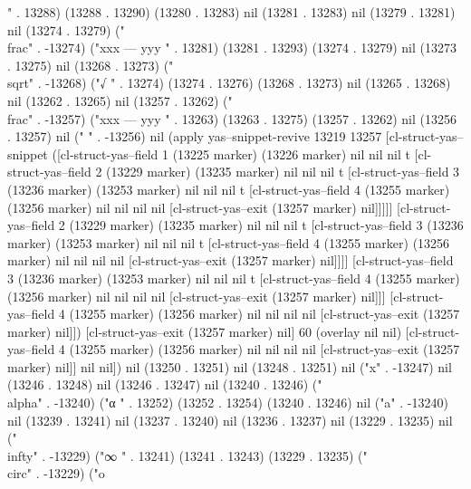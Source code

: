{" . 13288) (13288 . 13290) (13280 . 13283) nil (13281 . 13283) nil (13279 . 13281) nil (13274 . 13279) ("\\frac" . -13274) ("xxx
---
yyy
" . 13281) (13281 . 13293) (13274 . 13279) nil (13273 . 13275) nil (13268 . 13273) ("\\sqrt" . -13268) ("√
" . 13274) (13274 . 13276) (13268 . 13273) nil (13265 . 13268) nil (13262 . 13265) nil (13257 . 13262) ("\\frac" . -13257) ("xxx
---
yyy
" . 13263) (13263 . 13275) (13257 . 13262) nil (13256 . 13257) nil (" " . -13256) nil (apply yas--snippet-revive 13219 13257 [cl-struct-yas--snippet ([cl-struct-yas--field 1 (13225 marker) (13226 marker) nil nil nil t [cl-struct-yas--field 2 (13229 marker) (13235 marker) nil nil nil t [cl-struct-yas--field 3 (13236 marker) (13253 marker) nil nil nil t [cl-struct-yas--field 4 (13255 marker) (13256 marker) nil nil nil nil [cl-struct-yas--exit (13257 marker) nil]]]]] [cl-struct-yas--field 2 (13229 marker) (13235 marker) nil nil nil t [cl-struct-yas--field 3 (13236 marker) (13253 marker) nil nil nil t [cl-struct-yas--field 4 (13255 marker) (13256 marker) nil nil nil nil [cl-struct-yas--exit (13257 marker) nil]]]] [cl-struct-yas--field 3 (13236 marker) (13253 marker) nil nil nil t [cl-struct-yas--field 4 (13255 marker) (13256 marker) nil nil nil nil [cl-struct-yas--exit (13257 marker) nil]]] [cl-struct-yas--field 4 (13255 marker) (13256 marker) nil nil nil nil [cl-struct-yas--exit (13257 marker) nil]]) [cl-struct-yas--exit (13257 marker) nil] 60 (overlay nil nil) [cl-struct-yas--field 4 (13255 marker) (13256 marker) nil nil nil nil [cl-struct-yas--exit (13257 marker) nil]] nil nil]) nil (13250 . 13251) nil (13248 . 13251) nil ("x" . -13247) nil (13246 . 13248) nil (13246 . 13247) nil (13240 . 13246) ("\\alpha" . -13240) ("α
" . 13252) (13252 . 13254) (13240 . 13246) nil ("a" . -13240) nil (13239 . 13241) nil (13237 . 13240) nil (13236 . 13237) nil (13229 . 13235) nil ("\\infty" . -13229) ("∞
" . 13241) (13241 . 13243) (13229 . 13235) ("\\circ" . -13229) ("o
}
